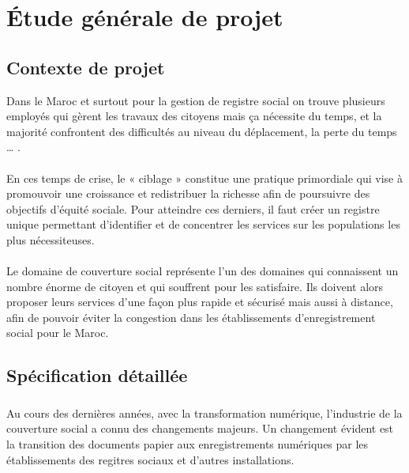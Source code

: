 \chapter{Étude générale de projet}
\section{Contexte de projet}
         Dans le Maroc et surtout pour la gestion de registre social on trouve plusieurs employés qui gèrent les travaux des citoyens mais ça nécessite du temps, et la majorité confrontent des difficultés au niveau du déplacement, la perte du temps … .\\\\
         En ces temps de crise, le « ciblage » constitue une pratique primordiale qui vise à promouvoir une croissance et redistribuer la richesse afin de poursuivre des objectifs d’équité sociale. Pour atteindre ces derniers, il faut créer un registre unique permettant d’identifier et de concentrer les services sur les populations les plus nécessiteuses.\\\\ 
       Le domaine de couverture social représente l’un des domaines qui connaissent un nombre énorme de citoyen et qui souffrent pour les satisfaire. Ils doivent alors proposer leurs services d’une façon plus rapide et sécurisé mais aussi à distance, afin de pouvoir éviter la congestion dans les établissements d’enregistrement social pour le Maroc.

\section{Spécification détaillée}
\subsection*{}
Au cours des dernières années, avec la transformation numérique, l’industrie de la couverture social  a connu des changements majeurs. Un changement évident est la transition des documents papier aux enregistrements numériques par les établissements des regitres sociaux et d’autres installations. \\

